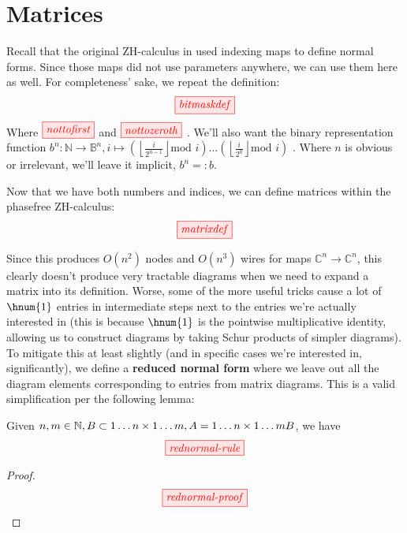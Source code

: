 \section{Matrices}\label{sec:matrices}
Recall that the original ZH-calculus in \cite{backens2018zhcalculus} used
indexing maps to define normal forms.  Since those maps did not use parameters
anywhere, we can use them here as well.  For completeness' sake, we repeat the
definition:
$$\tikzfig{bitmaskdef}$$
Where $\tikzfig{nottofirst}$ and $\tikzfig{nottozeroth}$ . We'll also want the
binary representation function 
$b^n : \mathbb{N} \rightarrow \mathbb{B}^n, i \mapsto \left( \left \lfloor
\frac{i}{2^{n-1}}\right \rfloor \text{mod } i \right) \ldots \left( \left \lfloor
\frac{i}{2^{0}}\right \rfloor \text{mod } i \right)$ . Where $n$ is obvious or
irrelevant, we'll leave it implicit, $b^n =: b$.

Now that we have both numbers and indices, we can define matrices within the
phasefree ZH-calculus:
$$\tikzfig{matrixdef}$$

Since this produces $O(n^2)$ nodes and $O(n^3)$ wires for maps $\mathbb{C}^n
\rightarrow \mathbb{C}^n$, this clearly doesn't produce very tractable diagrams
when we need to expand a matrix into its definition. Worse, some of the more
useful tricks cause a lot of $\hnum{1}$ entries in intermediate steps next to
the entries we're actually interested in (this is because $\hnum{1}$ is the
pointwise multiplicative identity, allowing us to construct diagrams by taking
Schur products of simpler diagrams). To mitigate this at least slightly (and in
specific cases we're interested in, significantly), we define a
\textbf{reduced normal form} where we leave out all the diagram elements
corresponding to  entries from matrix diagrams. This is a valid
simplification per the following lemma:
\begin{lemma}
    Given $n,m \in \mathbb{N}, B \subset {1 \ldots n} \times {1 \ldots m}, A =
    {1 \ldots n} \times {1 \ldots m}\\B$, we have 
    $$\tikzfig{rednormal-rule}$$
\end{lemma}
\begin{proof}
    $$\tikzfig{rednormal-proof}$$
\end{proof}


